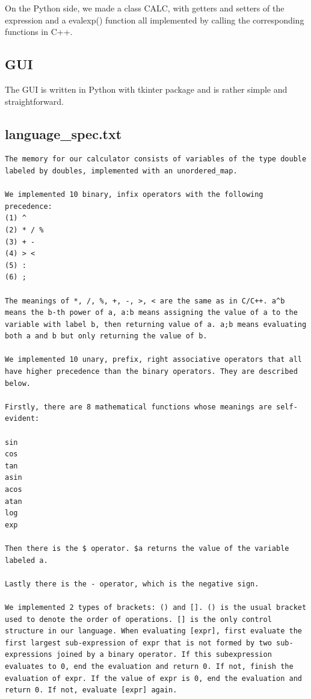 \documentclass[]{article}
\begin{document}
On the Python side, we made a class CALC, with getters and setters of the expression and a evalexp() function all implemented by calling the corresponding functions in C++.

\subsection{GUI}
The GUI is written in Python with tkinter package and is rather simple and straightforward.

\begin{appendices}
	\section{language\_spec.txt}
\begin{lstlisting}
The memory for our calculator consists of variables of the type double labeled by doubles, implemented with an unordered_map.
	
We implemented 10 binary, infix operators with the following precedence:
(1) ^
(2) * / %
(3) + -
(4) > <
(5) :
(6) ;
	
The meanings of *, /, %, +, -, >, < are the same as in C/C++. a^b means the b-th power of a, a:b means assigning the value of a to the variable with label b, then returning value of a. a;b means evaluating both a and b but only returning the value of b.
	
We implemented 10 unary, prefix, right associative operators that all have higher precedence than the binary operators. They are described below.
	
Firstly, there are 8 mathematical functions whose meanings are self-evident:
	
sin
cos
tan
asin
acos
atan
log
exp
	
Then there is the $ operator. $a returns the value of the variable labeled a.

Lastly there is the - operator, which is the negative sign.
	
We implemented 2 types of brackets: () and []. () is the usual bracket used to denote the order of operations. [] is the only control structure in our language. When evaluating [expr], first evaluate the first largest sub-expression of expr that is not formed by two sub-expressions joined by a binary operator. If this subexpression evaluates to 0, end the evaluation and return 0. If not, finish the evaluation of expr. If the value of expr is 0, end the evaluation and return 0. If not, evaluate [expr] again.
	

\end{lstlisting}
\end{appendices}
\end{document}
